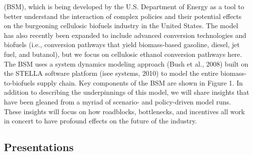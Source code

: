 \documentclass[]{article}
\begin{document}
(BSM), which is being developed by the U.S. Department of Energy as a
tool to better understand the interaction of complex policies and their
potential effects on the burgeoning cellulosic biofuels industry in the
United States. The model has also recently been expanded to include
advanced conversion technologies and biofuels (i.e., conversion pathways
that yield biomass-based gasoline, diesel, jet fuel, and butanol), but
we focus on cellulosic ethanol conversion pathways here. The BSM uses a
system dynamics modeling approach (Bush et al., 2008) built on the
STELLA software platform (isee systems, 2010) to model the entire
biomass-to-biofuels supply chain. Key components of the BSM are shown in
Figure 1. In addition to describing the underpinnings of this model, we
will share insights that have been gleaned from a myriad of scenario-
and policy-driven model runs. These insights will focus on how
roadblocks, bottlenecks, and incentives all work in concert to have
profound effects on the future of the industry.

\subsection{Presentations}\label{presentations}
\end{document}
